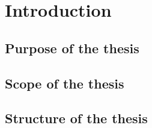 \chapter{Introduction}
\label{cha:introduction}


\section{Purpose of the thesis}
\label{sec:purpose}



\section{Scope of the thesis}
\label{sec:scope}




\section{Structure of the thesis}
\label{sec:structure}


















